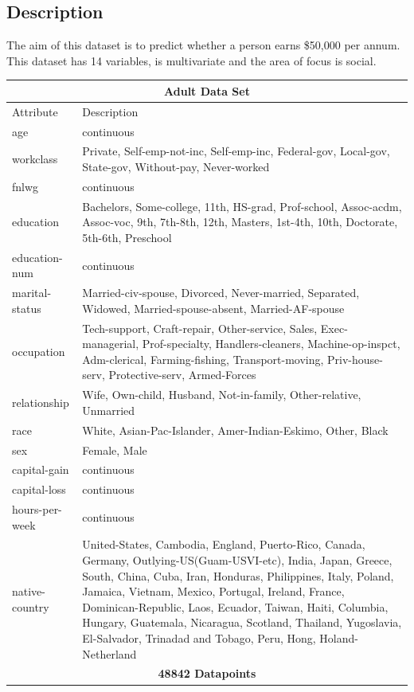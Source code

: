 \documentclass[12pt]{article}
\begin{document}
	\subsection{Description}
	The aim of this dataset is to predict whether a person earns \$50,000 per annum. This
	dataset has 14 variables, is multivariate and the area of focus is social.
	\begin{center}
		\begin{tabular}{|p{3cm}|p{12cm}|}
			\hline
			\multicolumn{2}{|c|}{\bfseries\Large Adult Data Set} \\
			\hline
			Attribute&Description\\
			\hline
			age&continuous\\
			workclass& Private, Self-emp-not-inc, Self-emp-inc, Federal-gov, Local-gov, State-gov, Without-pay, Never-worked\\
			fnlwg&continuous\\
			education&Bachelors, Some-college, 11th, HS-grad, Prof-school, Assoc-acdm, Assoc-voc, 9th, 7th-8th, 12th, Masters, 1st-4th, 10th, Doctorate, 5th-6th, Preschool\\
			education-num&continuous\\
			marital-status&Married-civ-spouse, Divorced, Never-married, Separated, Widowed, Married-spouse-absent, Married-AF-spouse\\
			occupation&Tech-support, Craft-repair, Other-service, Sales, Exec-managerial, Prof-specialty, Handlers-cleaners, Machine-op-inspct, Adm-clerical, Farming-fishing, Transport-moving, Priv-house-serv, Protective-serv, Armed-Forces\\
			relationship&Wife, Own-child, Husband, Not-in-family, Other-relative, Unmarried\\
			race&White, Asian-Pac-Islander, Amer-Indian-Eskimo, Other, Black\\
			sex&Female, Male\\
			capital-gain&continuous\\
			capital-loss&continuous\\
			hours-per-week&continuous\\
			native-country&United-States, Cambodia, England, Puerto-Rico, Canada, Germany, Outlying-US(Guam-USVI-etc), India, Japan, Greece, South, China, Cuba, Iran, Honduras, Philippines, Italy, Poland, Jamaica, Vietnam, Mexico, Portugal, Ireland, France, Dominican-Republic, Laos, Ecuador, Taiwan, Haiti, Columbia, Hungary, Guatemala, Nicaragua, Scotland, Thailand, Yugoslavia, El-Salvador, Trinadad and Tobago, Peru, Hong, Holand-Netherland\\
			\hline
			\multicolumn{2}{|c|}{\bfseries\large 48842 Datapoints} \\
			\hline
		\end{tabular}
	\end{center}
	
\end{document}
